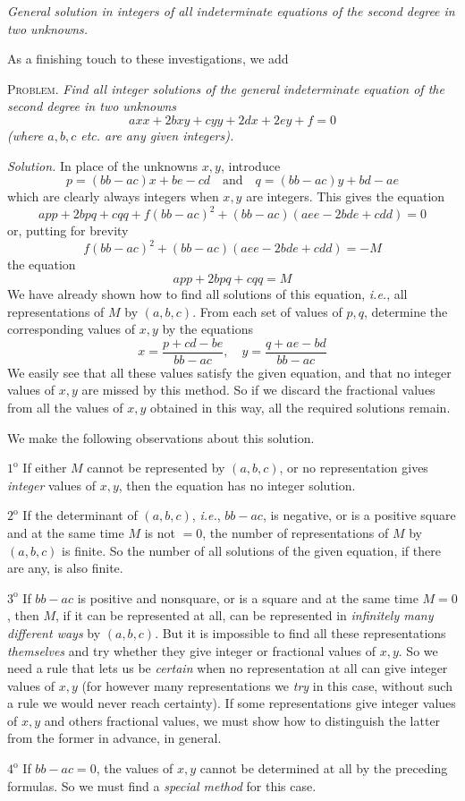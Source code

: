 \begin{center}
\textit{General solution in integers of all indeterminate equations of the second degree in two unknowns.}
\end{center}

As a finishing touch to these investigations, we add

\textsc{Problem.} \textit{Find all integer solutions of the general} \textit{indeterminate equation of the second degree in two unknowns}
\[
axx+2bxy+cyy+2dx+2ey+f=0
\]
\textit{(where $a,b,c$ etc. are any given integers).}

\textit{Solution.} In place of the unknowns $x,y$, introduce
\[
p=(bb-ac)x+be-cd\quad\text{and}\quad q=(bb-ac)y+bd-ae
\]
which are clearly always integers when $x,y$ are integers. This gives the equation
\[
app+2bpq+cqq+f(bb-ac)^2+(bb-ac)(aee-2bde+cdd)=0
\]
or, putting for brevity
\[
f(bb-ac)^2+(bb-ac)(aee-2bde+cdd)=-M
\]
the equation
\[
app+2bpq+cqq=M
\]
We have already shown how to find all solutions of this equation, \textit{i.e.}, all representations of $M$ by $(a,b,c)$. From each set of values of $p,q$, determine the corresponding values of $x,y$ by the equations
\[
x=\frac{p+cd-be}{bb-ac},\quad y=\frac{q+ae-bd}{bb-ac}
\]
We easily see that all these values satisfy the given equation, and that no integer values of $x,y$ are missed by this method. So if we discard the fractional values from all the values of $x,y$ obtained in this way, all the required solutions remain.

We make the following observations about this solution.

$1^{\mathrm{o}}$ If either $M$ cannot be represented by $(a,b,c)$, or no representation gives \textit{integer} values of $x,y$, then the equation has no integer solution.

$2^{\mathrm{o}}$ If the determinant of $(a,b,c)$, \textit{i.e.}, $bb-ac$, is negative, or is a positive square and at the same time $M$ is not $=0$, the number of representations of $M$ by $(a,b,c)$ is finite. So the number of all solutions of the given equation, if there are any, is also finite.

$3^{\mathrm{o}}$ If $bb-ac$ is positive and nonsquare, or is a square and at the same time $M=0$, then $M$, if it can be represented at all, can be represented in \textit{infinitely many different ways} by $(a,b,c)$. But it is impossible to find all these representations \textit{themselves} and try whether they give integer or fractional values of $x,y$. So we need a rule that lets us be \textit{certain} when no representation at all can give integer values of $x,y$ (for however many representations we \textit{try} in this case, without such a rule we would never reach certainty). If some representations give integer values of $x,y$ and others fractional values, we must show how to distinguish the latter from the former in advance, in general.

$4^{\mathrm{o}}$ If $bb-ac=0$, the values of $x,y$ cannot be determined at all by the preceding formulas. So we must find a \textit{special method} for this case.

